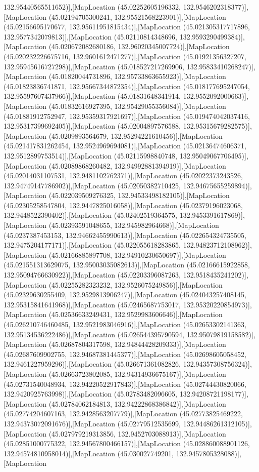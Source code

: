 132.95440565511652)],[MapLocation (45.02252605196332, 132.9546202318377)],[MapLocation (45.02194705300241, 132.95521568223901)],[MapLocation (45.02156695170677, 132.95611951815434)],[MapLocation (45.021305317717896, 132.9577342079813)],[MapLocation (45.02110814348696, 132.9593290499384)],[MapLocation (45.020672082680186, 132.96020345007724)],[MapLocation (45.020232226675716, 132.9601612471277)],[MapLocation (45.01921356327207, 132.95945616727298)],[MapLocation (45.018527217269906, 132.95833410268247)],[MapLocation (45.01820044731896, 132.95733863655923)],[MapLocation (45.01823836741871, 132.95667344872354)],[MapLocation (45.018177695247054, 132.95597607437966)],[MapLocation (45.01831648341914, 132.9552092000663)],[MapLocation (45.01832616927395, 132.95429055356084)],[MapLocation (45.01881912752947, 132.95359317921697)],[MapLocation (45.019474042037416, 132.95317399692405)],[MapLocation (45.02004897576588, 132.95315679282575)],[MapLocation (45.0209893564679, 132.95294221610456)],[MapLocation (45.021417831262454, 132.9524969694081)],[MapLocation (45.02136474606371, 132.9512899753514)],[MapLocation (45.02115998840748, 132.95049067706495)],[MapLocation (45.02089868260482, 132.94992881394919)],[MapLocation (45.02014031107531, 132.9481102762371)],[MapLocation (45.02022373243526, 132.94749147786902)],[MapLocation (45.02050382710425, 132.94675655259894)],[MapLocation (45.022039509276325, 132.94533498182105)],[MapLocation (45.02305258547804, 132.9447825016058)],[MapLocation (45.02379196023068, 132.9448522390402)],[MapLocation (45.02402519364575, 132.9453391617869)],[MapLocation (45.02393591048655, 132.945982964668)],[MapLocation (45.0237387453153, 132.94662455990613)],[MapLocation (45.022654324735505, 132.9475204177171)],[MapLocation (45.022055618283865, 132.94823712108962)],[MapLocation (45.02166885897708, 132.94910230650697)],[MapLocation (45.021551313629075, 132.95003035082613)],[MapLocation (45.02166615922858, 132.95094766630922)],[MapLocation (45.02203396087263, 132.9518435241202)],[MapLocation (45.02255282323232, 132.9526075249856)],[MapLocation (45.02329630255409, 132.9529813906247)],[MapLocation (45.024043257408145, 132.95315841641968)],[MapLocation (45.02465687753017, 132.95320220854973)],[MapLocation (45.02536633249431, 132.9529983606646)],[MapLocation (45.026210746460485, 132.9521983046916)],[MapLocation (45.02653302141363, 132.95134536222486)],[MapLocation (45.026544395790594, 132.95079819158582)],[MapLocation (45.02687804317598, 132.94844428209333)],[MapLocation (45.02687609902755, 132.94687381445377)],[MapLocation (45.02698605058452, 132.9461227959296)],[MapLocation (45.026671361082826, 132.94357308756324)],[MapLocation (45.02663723802085, 132.94314936675167)],[MapLocation (45.02731540048934, 132.94220522917843)],[MapLocation (45.02744430820066, 132.9420925763998)],[MapLocation (45.02783482096605, 132.94208721198177)],[MapLocation (45.02784062184813, 132.94222868386842)],[MapLocation (45.02774204607163, 132.9428563207779)],[MapLocation (45.02773825469222, 132.94373072091676)],[MapLocation (45.02779512535699, 132.94486261312105)],[MapLocation (45.027979219313856, 132.9452703088913)],[MapLocation (45.02851000775322, 132.94567800466157)],[MapLocation (45.028860088901126, 132.94574810958014)],[MapLocation (45.030027749201, 132.9457805328088)],[MapLocation 